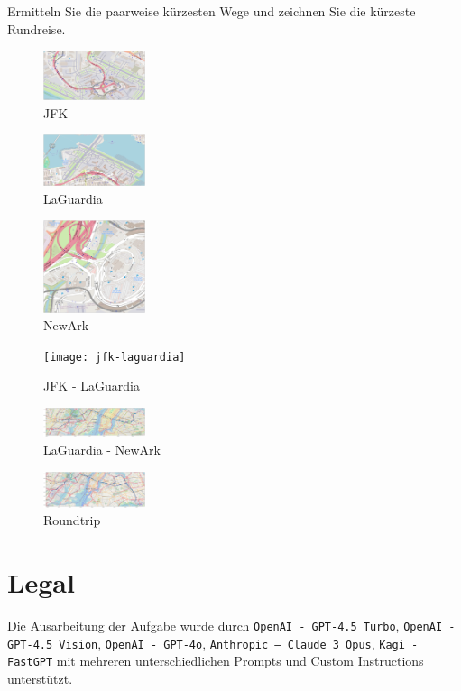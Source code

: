 \documentclass[a4paper,11pt]{report}
\begin{document}
Ermitteln Sie die paarweise kürzesten Wege und zeichnen Sie die kürzeste Rundreise.

\begin{figure}[htbp]
    \centering
    \includegraphics[width=3cm]{jfk}
    \caption{JFK}
    \label{fig:jfk}
\end{figure}

\begin{figure}[htbp]
    \centering
    \includegraphics[width=3cm]{laguardia}
    \caption{LaGuardia}
    \label{fig:laguardia}
\end{figure}

\begin{figure}[htbp]
    \centering
    \includegraphics[width=3cm]{newark}
    \caption{NewArk}
    \label{fig:newark}
\end{figure}

\begin{figure}[htbp]
    \centering
    \texttt{[image: jfk-laguardia]}
    \caption{JFK - LaGuardia}
    \label{fig:jfk-laguardia}
\end{figure}

\begin{figure}[htbp]
    \centering
    \includegraphics[width=3cm]{laguardia-newark}
    \caption{LaGuardia - NewArk}
    \label{fig:laguardia-newark}
\end{figure}

\begin{figure}[htbp]
    \centering
    \includegraphics[width=3cm]{roundtrip}
    \caption{Roundtrip}
    \label{fig:roundtrip}
\end{figure}
\newpage

\chapter{Legal}
Die Ausarbeitung der Aufgabe wurde durch \texttt{OpenAI - GPT-4.5 Turbo}, \texttt{OpenAI - GPT-4.5 Vision}, \texttt{OpenAI - GPT-4o}, \texttt{Anthropic -- Claude 3 Opus},  \texttt{Kagi - FastGPT} mit mehreren unterschiedlichen Prompts und Custom Instructions unterstützt.
\end{document}
